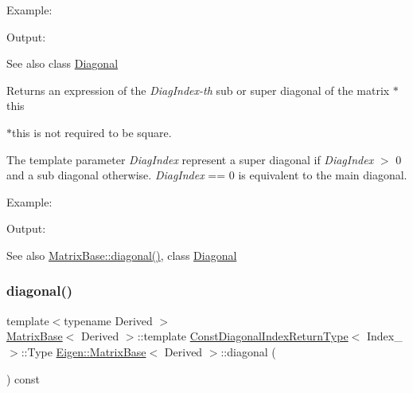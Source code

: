 Example\+: 
\begin{DoxyCodeInclude}{0}
\end{DoxyCodeInclude}
 Output\+: 
\begin{DoxyVerbInclude}
\end{DoxyVerbInclude}


\begin{DoxySeeAlso}{See also}
class \mbox{\hyperlink{class_eigen_1_1_diagonal}{Diagonal}}
\end{DoxySeeAlso}
\begin{DoxyReturn}{Returns}
an expression of the {\itshape Diag\+Index-\/th} sub or super diagonal of the matrix {\ttfamily $\ast$this} 
\end{DoxyReturn}
{\ttfamily $\ast$this} is not required to be square.

The template parameter {\itshape Diag\+Index} represent a super diagonal if {\itshape Diag\+Index} $>$ 0 and a sub diagonal otherwise. {\itshape Diag\+Index} == 0 is equivalent to the main diagonal.

Example\+: 
\begin{DoxyCodeInclude}{0}
\end{DoxyCodeInclude}
 Output\+: 
\begin{DoxyVerbInclude}
\end{DoxyVerbInclude}


\begin{DoxySeeAlso}{See also}
\mbox{\hyperlink{class_eigen_1_1_matrix_base_ab5768147536273eb2dbdfa389cfd26a3}{Matrix\+Base\+::diagonal()}}, class \mbox{\hyperlink{class_eigen_1_1_diagonal}{Diagonal}} 
\end{DoxySeeAlso}
\mbox{\label{class_eigen_1_1_matrix_base_aebdeedcf67e46d969c556c6c7d9780ee}} 
\subsubsection{\texorpdfstring{diagonal()}{diagonal()}\hspace{0.1cm}{\footnotesize\ttfamily [2/4]}}
{\footnotesize\ttfamily template$<$typename Derived $>$ \\
\mbox{\hyperlink{class_eigen_1_1_matrix_base}{Matrix\+Base}}$<$ Derived $>$\+::template \mbox{\hyperlink{struct_eigen_1_1_matrix_base_1_1_const_diagonal_index_return_type}{Const\+Diagonal\+Index\+Return\+Type}}$<$ Index\+\_\+ $>$\+::Type \mbox{\hyperlink{class_eigen_1_1_matrix_base}{Eigen\+::\+Matrix\+Base}}$<$ Derived $>$\+::diagonal (\begin{DoxyParamCaption}{ }\end{DoxyParamCaption}) const\hspace{0.3cm}{\ttfamily [inline]}}

